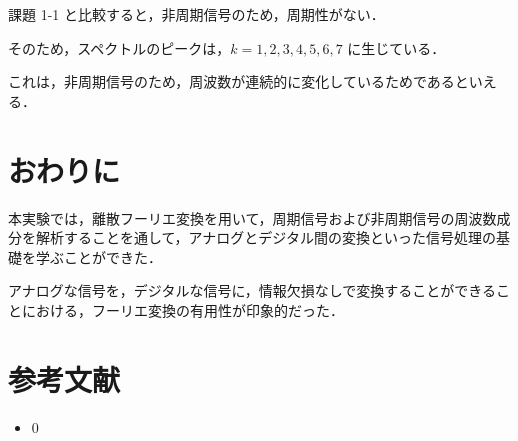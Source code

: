 \documentclass[fleqn, a4paper. 12pt]{jsarticle}
\begin{document}
    課題 1-1 と比較すると，非周期信号のため，周期性がない．

    そのため，スペクトルのピークは，$k = 1, 2, 3, 4, 5, 6, 7$ に生じている．

    これは，非周期信号のため，周波数が連続的に変化しているためであるといえる．

  \newpage

  \section*{おわりに}

    本実験では，離散フーリエ変換を用いて，周期信号および非周期信号の周波数成分を解析することを通して，アナログとデジタル間の変換といった信号処理の基礎を学ぶことができた．

    アナログな信号を，デジタルな信号に，情報欠損なしで変換することができることにおける，フーリエ変換の有用性が印象的だった．

  \newpage
  
  \section*{参考文献}

    \begin{itemize}
        \item 0
    \end{itemize}
\end{document}
